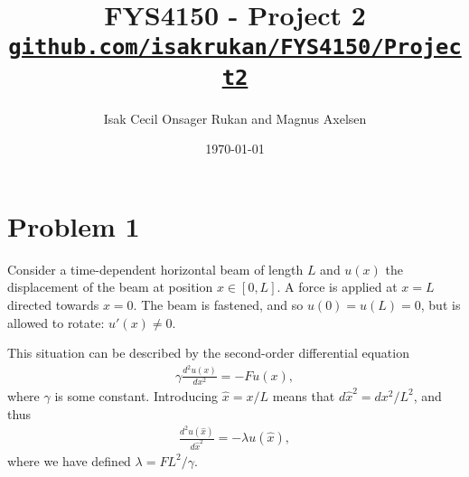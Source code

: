 \documentclass[english,notitlepage,reprint,nofootinbib]{revtex4-2}  %
\begin{document}
\title{FYS4150 - Project 2\\[0.5em]
  \small \href{https://github.com/isakrukan/FYS4150/tree/main/Project2}{\texttt{github.com/isakrukan/FYS4150/Project2}}
}
\author{Isak Cecil Onsager Rukan and Magnus Axelsen} %
\date{\today}                             %
\noaffiliation                            %
\maketitle

\section{Problem 1}
Consider a time-dependent horizontal beam of length \(L\) and \(u(x)\) the displacement of the beam at position \(x\in[0,L]\). A force is applied at \(x=L\) directed towards \(x=0\). The beam is fastened, and so \(u(0)=u(L)=0\), but is allowed to rotate: \(u'(x)\neq 0\).

This situation can be described by the second-order differential equation
\begin{align}
    \gamma \frac{d^2u(x)}{dx^2} = -Fu(x),
\end{align}
where \(\gamma\) is some constant. Introducing \(\hat{x}=x/L\) means that \(d\hat{x}^2 = dx^2/L^2\), and thus 
\begin{align}
    \frac{d^2u(\hat{x})}{d\hat{x}^2} 
    = -\lambda u(\hat{x}),
\end{align}
where we have defined \(\lambda = FL^2/\gamma\).
\onecolumngrid
% 


\end{document}
